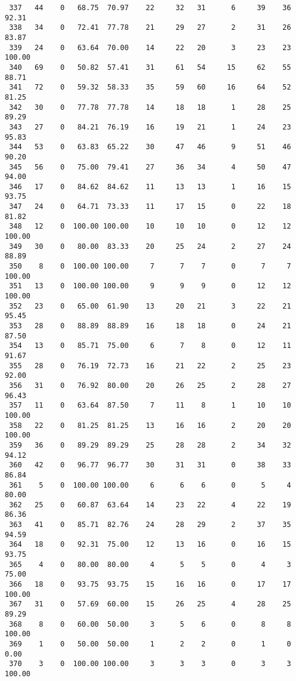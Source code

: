 \begin{verbatim}
 337   44    0   68.75  70.97    22     32   31      6     39    36    92.31
 338   34    0   72.41  77.78    21     29   27      2     31    26    83.87
 339   24    0   63.64  70.00    14     22   20      3     23    23   100.00
 340   69    0   50.82  57.41    31     61   54     15     62    55    88.71
 341   72    0   59.32  58.33    35     59   60     16     64    52    81.25
 342   30    0   77.78  77.78    14     18   18      1     28    25    89.29
 343   27    0   84.21  76.19    16     19   21      1     24    23    95.83
 344   53    0   63.83  65.22    30     47   46      9     51    46    90.20
 345   56    0   75.00  79.41    27     36   34      4     50    47    94.00
 346   17    0   84.62  84.62    11     13   13      1     16    15    93.75
 347   24    0   64.71  73.33    11     17   15      0     22    18    81.82
 348   12    0  100.00 100.00    10     10   10      0     12    12   100.00
 349   30    0   80.00  83.33    20     25   24      2     27    24    88.89
 350    8    0  100.00 100.00     7      7    7      0      7     7   100.00
 351   13    0  100.00 100.00     9      9    9      0     12    12   100.00
 352   23    0   65.00  61.90    13     20   21      3     22    21    95.45
 353   28    0   88.89  88.89    16     18   18      0     24    21    87.50
 354   13    0   85.71  75.00     6      7    8      0     12    11    91.67
 355   28    0   76.19  72.73    16     21   22      2     25    23    92.00
 356   31    0   76.92  80.00    20     26   25      2     28    27    96.43
 357   11    0   63.64  87.50     7     11    8      1     10    10   100.00
 358   22    0   81.25  81.25    13     16   16      2     20    20   100.00
 359   36    0   89.29  89.29    25     28   28      2     34    32    94.12
 360   42    0   96.77  96.77    30     31   31      0     38    33    86.84
 361    5    0  100.00 100.00     6      6    6      0      5     4    80.00
 362   25    0   60.87  63.64    14     23   22      4     22    19    86.36
 363   41    0   85.71  82.76    24     28   29      2     37    35    94.59
 364   18    0   92.31  75.00    12     13   16      0     16    15    93.75
 365    4    0   80.00  80.00     4      5    5      0      4     3    75.00
 366   18    0   93.75  93.75    15     16   16      0     17    17   100.00
 367   31    0   57.69  60.00    15     26   25      4     28    25    89.29
 368    8    0   60.00  50.00     3      5    6      0      8     8   100.00
 369    1    0   50.00  50.00     1      2    2      0      1     0     0.00
 370    3    0  100.00 100.00     3      3    3      0      3     3   100.00

\end{verbatim}

